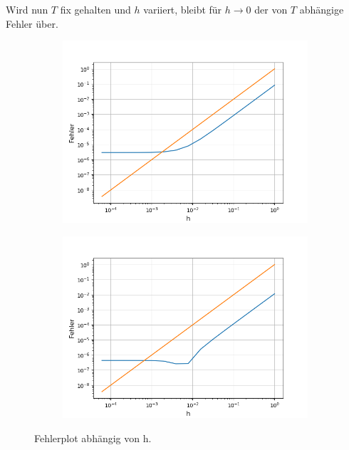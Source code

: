 \documentclass[12pt,a4paper]{scrartcl}
\numberwithin{equation}{section}
\numberwithin{myalgctr}{section}
\numberwithin{mytheoremctr}{subsection}
\numberwithin{mykorollarctr}{subsection}
\numberwithin{mylemmactr}{subsection}
\numberwithin{mybeispielctr}{subsection}
\begin{document}
	
	
	Wird nun $T$ fix gehalten und $h$ variiert, bleibt f\"ur $h\to 0$ der von $T$ abh\"angige Fehler \"uber. 
	
	\begin{figure}[H]
		\begin{subfigure}[t]{0.5\textwidth}
			\includegraphics[width=\linewidth]{FehlerplotTsinx.png}
			 \label{fig:fehlerplottsinx}
		\end{subfigure}
		\begin{subfigure}[t]{0.5\textwidth}
			\includegraphics[width=\linewidth]{FehlerplotTexp.png}
			 \label{fig:fehlerplottexp}
		\end{subfigure}
		\caption{Fehlerplot abhängig von h.}
		\label{fig:fehlerplott}
	\end{figure}
	
\end{document}

